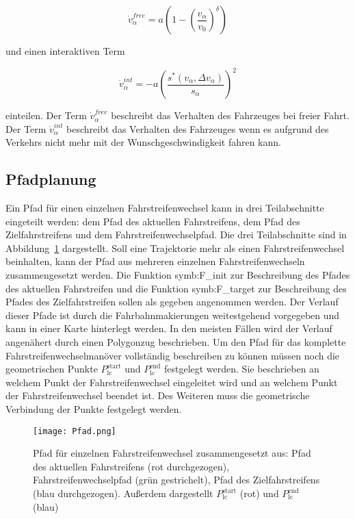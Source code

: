 \begin{equation}
   \dot{v}_\alpha^{free} = a \left( 1 - \left( \frac{v_\alpha}{v_0} \right) ^\delta \right)
\end{equation}

und einen interaktiven Term 

\begin{equation}
   \dot{v}_\alpha^{int} = - a \left( \frac{s^*(v_\alpha, \Delta v_\alpha)}{s_\alpha} \right)^2
\end{equation}

einteilen.
Der Term \( \dot{v}_\alpha^{free} \) beschreibt das Verhalten des Fahrzeuges bei freier Fahrt.
Der Term \( \dot{v}_\alpha^{int} \) beschreibt das Verhalten des Fahrzeuges wenn es aufgrund des Verkehrs nicht mehr mit der Wunschgeschwindigkeit fahren kann.


\subsection{Pfadplanung}
\label{sec:Pfadplanung}
Ein Pfad f\"ur einen einzelnen Fahrstreifenwechsel kann in drei Teilabschnitte eingeteilt werden: dem Pfad des aktuellen Fahrstreifens, dem Pfad des Zielfahrstreifens und dem Fahrstreifenwechselpfad.
Die drei Teilabschnitte sind in Abbildung~\ref{fig:Pfad} dargestellt.
Soll eine Trajektorie mehr als einen Fahrstreifenwechsel beinhalten, kann der Pfad aus mehreren einzelnen Fahrstreifenwechseln zusammengesetzt werden.
Die Funktion \gls{symb:F_init} zur Beschreibung des Pfades des aktuellen Fahrstreifen und die Funktion \gls{symb:F_target} zur Beschreibung des Pfades des Zielfahrstreifen sollen als gegeben angenommen werden.
Der Verlauf dieser Pfade ist durch die Fahrbahnmakierungen weitestgehend vorgegeben und kann in einer Karte hinterlegt werden.
In den meisten F\"allen wird der Verlauf angen\"ahert durch einen Polygonzug beschrieben.
Um den Pfad f\"ur das komplette Fahrstreifenwechselman\"over vollst\"andig beschreiben zu k\"onnen m\"ussen noch die geometrischen Punkte \( P_\mathrm{lc}^\mathrm{start}\) und \( P_\mathrm{lc}^\mathrm{end}\) festgelegt werden.
Sie beschrieben an welchem Punkt der Fahrstreifenwechsel eingeleitet wird und an welchem Punkt der Fahrstreifenwechsel beendet ist.
Des Weiteren muss die geometrische Verbindung der Punkte festgelegt werden.

\begin{figure}[!htbp]
    \centering
    \texttt{[image: Pfad.png]}
    \caption[Pfadplanung]{Pfad f\"ur einzelnen Fahrstreifenwechsel zusammengesetzt aus: Pfad des aktuellen Fahrstreifens (rot durchgezogen), Fahrstreifenwechselpfad (gr\"un gestrichelt), Pfad des Zielfahrstreifens (blau durchgezogen). Au{\ss}erdem dargestellt  \( P_\mathrm{lc}^\mathrm{start}\) (rot) und \( P_\mathrm{lc}^\mathrm{end}\) (blau)}
    \label{fig:Pfad}
\end{figure}


